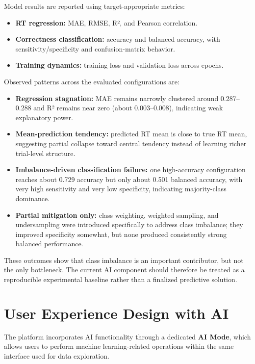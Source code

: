 Model results are reported using target-appropriate metrics:
\begin{itemize}
    \item \textbf{RT regression:} MAE, RMSE, R², and Pearson correlation.
    \item \textbf{Correctness classification:} accuracy and balanced accuracy, with sensitivity/specificity and confusion-matrix behavior.
    \item \textbf{Training dynamics:} training loss and validation loss across epochs.
\end{itemize}

Observed patterns across the evaluated configurations are:
\begin{itemize}
    \item \textbf{Regression stagnation:} MAE remains narrowly clustered around 0.287--0.288 and R² remains near zero (about 0.003--0.008), indicating weak explanatory power.
    \item \textbf{Mean-prediction tendency:} predicted RT mean is close to true RT mean, suggesting partial collapse toward central tendency instead of learning richer trial-level structure.
    \item \textbf{Imbalance-driven classification failure:} one high-accuracy configuration reaches about 0.729 accuracy but only about 0.501 balanced accuracy, with very high sensitivity and very low specificity, indicating majority-class dominance.
    \item \textbf{Partial mitigation only:} class weighting, weighted sampling, and undersampling were introduced specifically to address class imbalance; they improved specificity somewhat, but none produced consistently strong balanced performance.
\end{itemize}

These outcomes show that class imbalance is an important contributor, but not the only bottleneck. The current AI component should therefore be treated as a reproducible experimental baseline rather than a finalized predictive solution.

\pagebreak
\section{User Experience Design with AI}
\label{sec:ux-ai}

The platform incorporates AI functionality through a dedicated \textbf{AI Mode}, which allows users to perform machine learning-related operations within the same interface used for data exploration.


